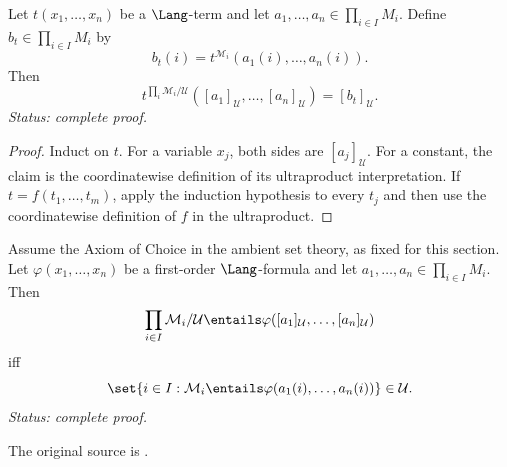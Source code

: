 \begin{lemma}
\label{lem:los-terms}
Let \(t(x_1,\ldots,x_n)\) be a \(\Lang\)-term and let
\(a_1,\ldots,a_n\in\prod_{i\in I}M_i\).  Define
\(b_t\in\prod_{i\in I}M_i\) by
\[
  b_t(i)=t^{\mathcal M_i}(a_1(i),\ldots,a_n(i)).
\]
Then
\[
  t^{\prod_i\mathcal M_i/\mathcal U}
  ([a_1]_{\mathcal U},\ldots,[a_n]_{\mathcal U})
  =[b_t]_{\mathcal U}.
\]
\textit{Status: complete proof.}
\end{lemma}

\begin{proof}
Induct on \(t\).  For a variable \(x_j\), both sides are
\([a_j]_{\mathcal U}\).  For a constant, the claim is the coordinatewise
definition of its ultraproduct interpretation.  If
\(t=f(t_1,\ldots,t_m)\), apply the induction hypothesis to every \(t_j\) and
then use the coordinatewise definition of \(f\) in the ultraproduct.
\end{proof}

\begin{theorem}[\L o\'s's theorem]
\label{thm:los}
Assume the Axiom of Choice in the ambient set theory, as fixed for this
section.  Let \(\varphi(x_1,\ldots,x_n)\) be a first-order
\(\Lang\)-formula and let
\(a_1,\ldots,a_n\in\prod_{i\in I}M_i\).  Then
\[
  \prod_{i\in I}\mathcal M_i/\mathcal U
  \entails\varphi([a_1]_{\mathcal U},\ldots,[a_n]_{\mathcal U})
\]
iff
\[
  \set{i\in I:\mathcal M_i\entails
  \varphi(a_1(i),\ldots,a_n(i))}\in\mathcal U.
\]
\textit{Status: complete proof.}
\end{theorem}

The original source is \cite{Los1955Ultraproducts}.

